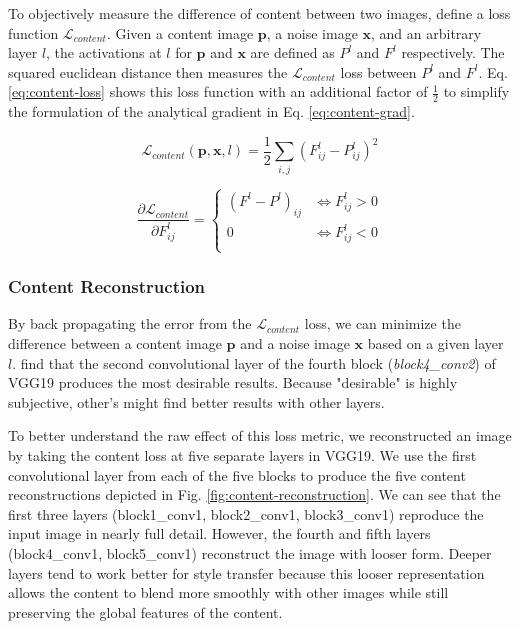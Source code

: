 \documentclass{article}
\begin{document}
To objectively measure the difference of content between two images,
\cite{2015arXiv150806576G} define a loss function $\mathcal{L}_{content}$.
Given a content image $\textbf{p}$, a noise image $\textbf{x}$, and an
arbitrary layer $l$, the activations at $l$ for $\textbf{p}$ and $\textbf{x}$
are defined as $P^l$ and $F^l$ respectively. The squared euclidean distance
then measures the $\mathcal{L}_{content}$ loss between $P^l$ and $F^l$. Eq.
\ref{eq:content-loss} shows this loss function with an additional factor of
$\frac{1}{2}$ to simplify the formulation of the analytical gradient in Eq.
\ref{eq:content-grad}.

\begin{equation}
\label{eq:content-loss}
\mathcal{L}_{content}(\mathbf{p}, \mathbf{x}, l) =
\frac{1}{2} \sum_{i,j}{(F^l_{ij} - P^l_{ij})^2}
\end{equation}

\begin{equation}
\label{eq:content-grad}
\frac{\partial \mathcal{L}_{content}}{\partial F^l_{ij}} =
\begin{cases}
    (F^l - P^l)_{ij} & \iff F^l_{ij} > 0 \\
    0 & \iff F^l_{ij} < 0 \\
\end{cases}
\end{equation}

\subsubsection{Content Reconstruction}

By back propagating the error from the $\mathcal{L}_{content}$ loss, we can
minimize the difference between a content image $\textbf{p}$ and a noise image
$\textbf{x}$ based on a given layer $l$. \cite{2015arXiv150806576G} find that
the second convolutional layer of the fourth block (\textit{block4\_conv2}) of
VGG19 produces the most desirable results. Because "desirable" is highly
subjective, other's might find better results with other layers.

To better understand the raw effect of this loss metric, we reconstructed an
image by taking the content loss at five separate layers in VGG19. We use the
first convolutional layer from each of the five blocks to produce the five
content reconstructions depicted in Fig. \ref{fig:content-reconstruction}. We
can see that the first three layers (block1\_conv1, block2\_conv1,
block3\_conv1) reproduce the input image in nearly full detail. However, the
fourth and fifth layers (block4\_conv1, block5\_conv1) reconstruct the image
with looser form. Deeper layers tend to work better for style transfer because
this looser representation allows the content to blend more smoothly with
other images while still preserving the global features of the content.
\end{document}
